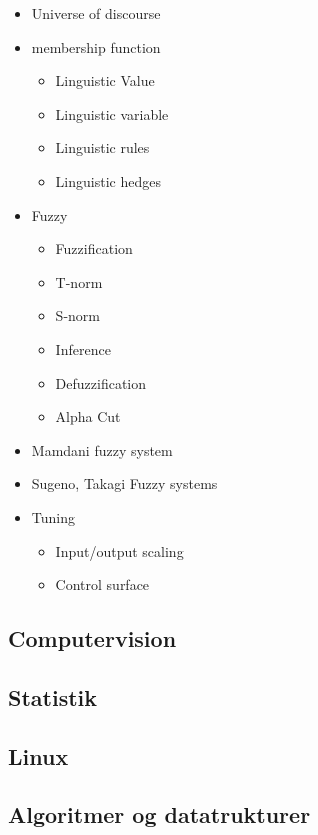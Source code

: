 \documentclass[a4paper,11pt]{article}
\begin{document}
\begin{itemize}
\begin{itemize}
\begin{itemize}
                    \item Universe of discourse
                    \item membership function
                        \begin{itemize}
                            \item Linguistic Value
                            \item Linguistic variable
                            \item Linguistic rules
                            \item Linguistic hedges
                        \end{itemize}
                    \item Fuzzy
                        \begin{itemize}
                            \item Fuzzification 
                            \item T-norm
                            \item S-norm
                            \item Inference
                            \item Defuzzification
                            \item Alpha Cut
                                
                        \end{itemize}
                    \item Mamdani fuzzy system
                    \item Sugeno, Takagi Fuzzy systems
                    \item Tuning
                        \begin{itemize}
                            \item Input/output scaling
                            \item Control surface
                        \end{itemize}
                \end{itemize}
        \end{itemize}
        
\end{itemize}

\subsection{Computervision}
\subsection{Statistik}
\subsection{Linux}
\subsection{Algoritmer og datatrukturer}
\end{document}
